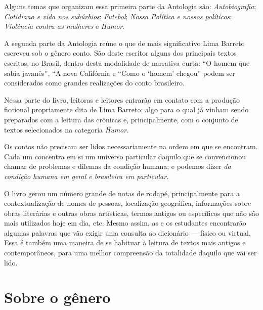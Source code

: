 Alguns temas que organizam essa primeira parte da Antologia são:
\textit{Autobiografia}; \textit{Cotidiano e vida nos subúrbios};
\textit{Futebol}; \textit{Nossa Política e nossos políticos};
\textit{Violência contra as mulheres} e \textit{Humor}.

A segunda parte da Antologia reúne o que de mais significativo Lima
Barreto escreveu sob o gênero conto. São deste escritor alguns dos
principais textos escritos, no Brasil, dentro desta modalidade de
narrativa curta: ``O homem que sabia javanês'', ``A nova Califórnia e
``Como o `homem' chegou'' podem ser considerados como grandes
realizações do conto brasileiro.

Nessa parte do livro, leitoras e leitores entrarão em contato com a
produção ficcional propriamente dita de Lima Barreto; algo para o qual
já vinham sendo preparados com a leitura das crônicas e, principalmente,
com o conjunto de textos selecionados na categoria \emph{Humor}.

Os contos não precisam ser lidos necessariamente na ordem em que se
encontram. Cada um concentra em si um universo particular daquilo que se
convencionou chamar de problemas e dilemas da condição humana; e podemos
dizer \emph{da condição humana em geral e brasileira em particular.}

O livro gerou um número grande de notas de rodapé, principalmente para a
contextualização de nomes de pessoas, localização geográfica,
informações sobre obras literárias e outras obras artísticas, termos
antigos ou específicos que não são mais utilizados hoje em dia, etc.
Mesmo assim, as e os estudantes encontrarão algumas palavras que vão
exigir uma consulta ao dicionário --- físico ou virtual. Essa é também
uma maneira de se habituar à leitura de textos mais antigos e
contemporâneos, para uma melhor compreensão da totalidade daquilo que
vai ser lido.


\section{Sobre o gênero}
